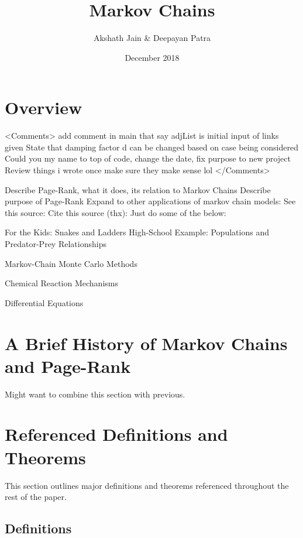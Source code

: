 \documentclass{article}
\title{Markov Chains}
\author{Akshath Jain \& Deepayan Patra}
\date{December 2018}
\begin{document}
\maketitle

\section{Overview}
<Comments> 
add comment in main that say adjList is initial input of links given
State that damping factor d can be changed based on case being considered
Could you my name to top of code, change the date, fix purpose to new project
Review things i wrote once make sure they make sense lol
</Comments>


Describe Page-Rank, what it does, its relation to Markov Chains
Describe purpose of Page-Rank
Expand to other applications of markov chain models:
See this source:
Cite this source (thx):
Just do some of the below:

For the Kids: Snakes and Ladders
High-School Example: Populations and Predator-Prey Relationships

Markov-Chain Monte Carlo Methods

Chemical Reaction Mechanisms

Differential Equations

\section{A Brief History of Markov Chains and Page-Rank}
Might want to combine this section with previous.

\section{Referenced Definitions and Theorems}
    This section outlines major definitions and theorems referenced throughout the rest of the paper.
    \subsection{Definitions}
    
\end{document}

